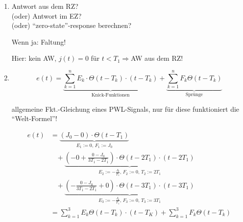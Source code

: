 \begin{enumerate}
  \item Antwort aus dem \acs{RZ}? \\
    (oder) Antwort im EZ? \\
    (oder) ``zero-state''-response berechnen?

    Wenn ja: Faltung!

    Hier: kein \acs{AW}, $j(t)=0$ für $t<T_1 \Rightarrow$AW aus dem \acs{RZ}!
  \item
    \colorbox{blue!20}{
    \begin{minipage}{0.6\textwidth}
    \[e(t) =\underbrace{\sum_{k=1}^{n} E_k
          \cdot\Theta(t-T_k)\cdot(t-T_k)}_{
            \text{Knick-Funktionen}}
        +\underbrace{\sum_{k=1}^{n}F_k\Theta(t-T_k)}_{\text{Sprünge} }
    \]
    \end{minipage}}
    \hfill
    \begin{minipage}{0.3\textwidth}
            \footnotesize allgemeine Fkt.-Gleichung eines \acs{PWL}-Signals,
            nur für diese funktioniert die ``Welt-Formel''!
    \end{minipage}
  
  \begin{minipage}{0.3\textwidth}
  \end{minipage}%
  \begin{minipage}{0.7\textwidth}
    \begin{align*}
      e(t) &=\underbrace{(J_0-0)\cdot\Theta(t-T_1)}_{
          E_1:=0,\, F_1:=J_0}\\
        &\;\;\;+\underbrace{\left(-0+\frac{0-J_0}{3T_1-2T_1}\right)
          \cdot\Theta(t-2T_1)\cdot(t-2T_1)}_{
            E_2:=-\frac{J_0}{T_1},\, F_2:=0,\, T_2:=2T_1}\\
        &\;\;\;+\underbrace{\left(-\frac{0-J_0}{3T_1-2T_1}+0\right)
          \cdot\Theta(t-3T_1)\cdot(t-3T_1)}_{
            E_3:=-\frac{J_0}{T_1},\, F_3:=0,\, T_3:=3T_1}  \\
      &=\sum_{k=1}^{3} E_k\Theta(t-T_k)\cdot(t-T_K)
        +\sum_{k=1}^{3} F_k\Theta(t-T_k)
    \end{align*}
  \end{minipage}



\end{enumerate}
